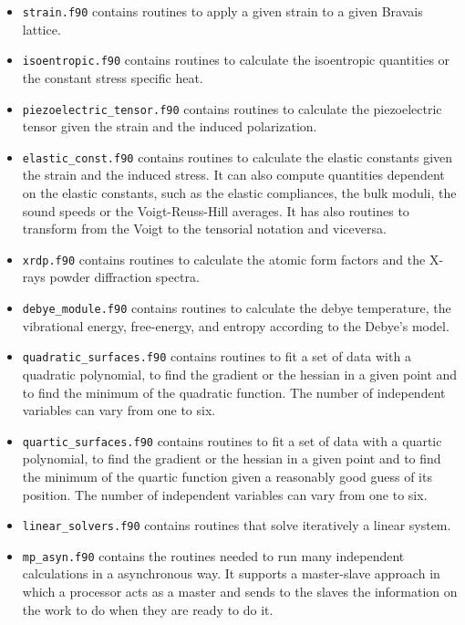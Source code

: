 \documentclass[12pt,a4paper]{article}
\begin{document}
\begin{itemize}
\item
\texttt{strain.f90} contains routines to apply a given strain to a given
Bravais lattice.

\item
\texttt{isoentropic.f90} contains routines to calculate the isoentropic
quantities or the constant stress specific heat.

\item
\texttt{piezoelectric\_tensor.f90} contains routines to calculate the
piezoelectric tensor given the strain and the induced polarization.

\item
\texttt{elastic\_const.f90} contains routines to calculate the elastic
constants given the strain and the induced stress. It can also compute
quantities dependent on the elastic constants, such as the elastic 
compliances, the bulk moduli, the sound speeds or the Voigt-Reuss-Hill 
averages. It has also routines to transform from the Voigt to the 
tensorial notation and viceversa.

\item
\texttt{xrdp.f90} contains routines to calculate the atomic form factors 
and the X-rays powder diffraction spectra.

\item
\texttt{debye\_module.f90} contains routines to calculate the debye 
temperature, the vibrational energy, free-energy, and entropy according
to the Debye's model.

\item
\texttt{quadratic\_surfaces.f90} contains routines to fit a set of data
with a quadratic polynomial, to find the gradient or the hessian in 
a given point and to find the minimum of the quadratic function. 
The number of independent variables can vary from one to six.

\item
\texttt{quartic\_surfaces.f90} contains routines to fit a set of data
with a quartic polynomial, to find the gradient or the hessian in 
a given point and to find the minimum of the quartic function given a 
reasonably good guess of its position.
The number of independent variables can vary from one to six.

\item
\texttt{linear\_solvers.f90} contains routines that solve iteratively
a linear system. 

\item
\texttt{mp\_asyn.f90} contains the routines needed to run many 
independent calculations in a asynchronous way. It supports a master-slave
approach in which a processor acts as a master and sends to the slaves
the information on the work to do when they are ready to do it.


\end{itemize}
\end{document}
